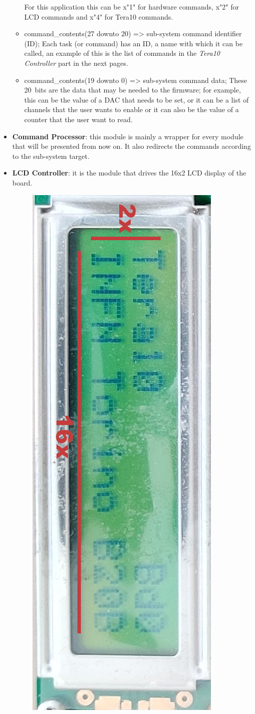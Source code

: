\begin{itemize}
\begin{itemize}
		\newline
		For this application this can be x"1" for hardware commands, x"2" for LCD commands and x"4" for Tera10 commands.
		\item command\_contents(27 downto 20) => sub-system command identifier (ID);
		\newline
		Each task (or command) has an ID, a name with which it can be called, an example of this is the list of commands in the \textit{Tera10 Controller} part in the next pages.
		\item command\_contents(19 downto 0) => sub-system command data;
		\newline
		These 20~bits are the data that may be needed to the firmware; for example, this can be the value of a DAC that needs to be set, or it can be a list of channels that the user wants to enable or it can also be the value of a counter that the user want to read. 
	\end{itemize} 
	\item \textbf{Command Processor}: this module is mainly a wrapper for every module that will be presented from now on. It also 
	redirects the commands according to the sub-system target.
	\item \textbf{LCD Controller}: it is the module that drives the 16x2 LCD display of the board.
	\begin{figure}[H]
		\centering
		\includegraphics[width=0.5\linewidth]{IMG/ch4/LCD}

\end{figure}
\end{itemize}
